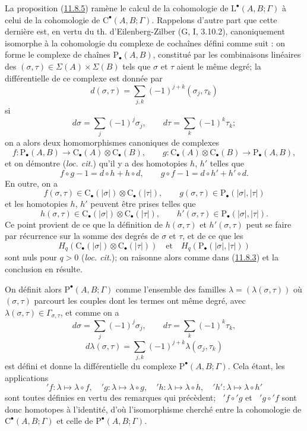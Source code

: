 \begin{env}[11.8.6]
\label{0.11.8.6-fr}
La proposition (\hyperref[0.11.8.5-fr]{11.8.5}) ramène le calcul de la
cohomologie de $\mathrm L^\bullet(A,B;\Gamma)$ à celui de la cohomologie de
$\mathrm C^\bullet(A,B;\Gamma)$. Rappelons d'autre part que cette dernière
est, en vertu du th. d'Eilenberg-Zilber (G, I, 3.10.2), canoniquement
isomorphe à la cohomologie du complexe de cochaînes défini comme suit : on
forme le complexe de chaînes $\mathrm P_\bullet(A,B)$, constitué par les
combinaisons linéaires des $(\sigma,\tau)\in\Sigma(A)\times\Sigma(B)$ tels
que $\sigma$ et $\tau$ aient le même degré; la différentielle de ce complexe
est donnée par
\[
d(\sigma,\tau)=\sum_{j,k}(-1)^{j+k}(\sigma_j,\tau_k)
\]
si
\[
d\sigma=\sum_j(-1)^j\sigma_j,\qquad
d\tau=\sum_k(-1)^k\tau_k;
\]
on a alors deux homomorphismes canoniques de complexes
\[
f:\mathrm P_\bullet(A,B)\longrightarrow
\mathrm C_\bullet(A)\otimes\mathrm C_\bullet(B),\qquad
g:\mathrm C_\bullet(A)\otimes\mathrm C_\bullet(B)
\longrightarrow\mathrm P_\bullet(A,B),
\]
et on démontre (\emph{loc. cit.}) qu'il y a des homotopies $h$, $h'$ telles
que
\[
f\circ g-1=d\circ h+h\circ d,\qquad
g\circ f-1=d\circ h'+h'\circ d.
\]
En outre, on a
\[
f(\sigma,\tau)\in\mathrm C_\bullet(|\sigma|)
\otimes\mathrm C_\bullet(|\tau|),\qquad
g(\sigma,\tau)\in\mathrm P_\bullet(|\sigma|,|\tau|)
\]
et les homotopies $h$, $h'$ peuvent être prises telles que
\[
h(\sigma,\tau)\in\mathrm C_\bullet(|\sigma|)
\otimes\mathrm C_\bullet(|\tau|),\qquad
h'(\sigma,\tau)\in\mathrm P_\bullet(|\sigma|,|\tau|).
\]
Ce point provient de ce que la définition de $h(\sigma,\tau)$ et
$h'(\sigma,\tau)$ peut se faire par récurrence sur la somme des degrés de
$\sigma$ et $\tau$, et de ce que les
\[
H_q(\mathrm C_\bullet(|\sigma|)\otimes\mathrm C_\bullet(|\tau|))
\quad\text{et}\quad
H_q(\mathrm P_\bullet(|\sigma|,|\tau|))
\]
sont nuls pour $q>0$ (\emph{loc. cit.}); on raisonne alors comme dans
(\hyperref[0.11.8.3-fr]{11.8.3}) et la conclusion en résulte.

On définit alors $\mathrm P^\bullet(A,B;\Gamma)$ comme l'ensemble des
familles $\lambda=(\lambda(\sigma,\tau))$ où $(\sigma,\tau)$ parcourt les
couples dont les termes ont même degré, avec
$\lambda(\sigma,\tau)\in\Gamma_{\sigma,\tau}$, et comme on a
\[
d\sigma=\sum_j(-1)^j\sigma_j,\qquad
d\tau=\sum_k(-1)^k\tau_k,
\]
\[
d\lambda(\sigma,\tau)=
\sum_{j,k}(-1)^{j+k}\lambda(\sigma_j,\tau_k)
\]
est défini et donne la différentielle du complexe
$\mathrm P^\bullet(A,B;\Gamma)$. Cela étant, les applications
\[
{}'f:\lambda\mapsto\lambda\circ f,\quad
{}'g:\lambda\mapsto\lambda\circ g,\quad
{}'h:\lambda\mapsto\lambda\circ h,\quad
{}'h':\lambda\mapsto\lambda\circ h'
\]
sont toutes définies en vertu des remarques qui précèdent;
$\mathop{}'f\circ{}'g$ et $\mathop{}'g\circ{}'f$ sont donc homotopes à
l'identité, d'où l'isomorphisme cherché entre la cohomologie de
$\mathrm C^\bullet(A,B;\Gamma)$ et celle de
$\mathrm P^\bullet(A,B;\Gamma)$.
\end{env}

